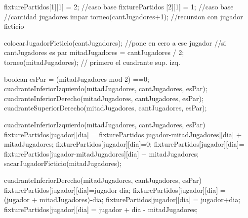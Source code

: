 \documentclass[11pt, a4paper, spanish]{article}
\begin{document}
\begin{algorithmic}

		\STATE	fixturePartidos[1][1] = 2;								\STATE	//caso base
		\STATE	fixturePartidos [2][1] = 1;	  						\STATE	//caso base
	\ELSE
			      					\STATE	//cantidad jugadores impar
				\STATE	torneo(cantJugadores+1);      					//recursion con jugador ficticio
				
				\STATE	colocarJugadorFicticio(cantJugadores);  //pone en cero a ese jugador
			\ELSE   \STATE	//si cantJugadores es par
				\STATE	mitadJugadores = cantJugadores / 2; 
				\STATE	torneo(mitadJugadores);      						// primero el cuadrante sup. izq.  
				
				\STATE	boolean esPar = (mitadJugadores mod 2) ==0;
				\STATE	cuadranteInferiorIzquierdo(mitadJugadores, cantJugadores, esPar);
				\STATE	cuadranteInferiorDerecho(mitadJugadores, cantJugadores, esPar);
				\STATE	cuadranteSuperiorDerecho(mitadJugadores, cantJugadores, esPar);
			\ENDIF
	 \ENDIF
	 
	 \STATE	cuadranteInferiorIzquierdo(mitadJugadores, cantJugadores, esPar)
					\STATE	fixturePartidos[jugador][dia] = fixturePartidos[jugador-mitadJugadores][dia] + mitadJugadores;
				\ENDFOR
			\ENDFOR
		\ELSE
						\STATE	fixturePartidos[jugador][dia]=0;
					\ELSE
						\STATE	fixturePartidos[jugador][dia]= fixturePartidos[jugador-mitadJugadores][dia] + mitadJugadores;
					\ENDIF
				\ENDFOR
			\ENDFOR
			\STATE	sacarJugadorFicticio(mitadJugadores);
		\ENDIF
		
		
		\STATE	cuadranteInferiorDerecho(mitadJugadores, cantJugadores, esPar)
						\STATE	fixturePartidos[jugador][dia]=jugador-dia;
					\ELSE
						\STATE	fixturePartidos[jugador][dia] = (jugador + mitadJugadores)-dia;
					\ENDIF
				\ENDFOR
			\ENDFOR
		\ELSE
						\STATE	fixturePartidos[jugador][dia] = jugador+dia;
					\ELSE
						\STATE	fixturePartidos[jugador][dia] = jugador + dia - mitadJugadores;
					\ENDIF
				\ENDFOR
			\ENDFOR
		\ENDIF
	

\end{algorithmic}
\end{document}
